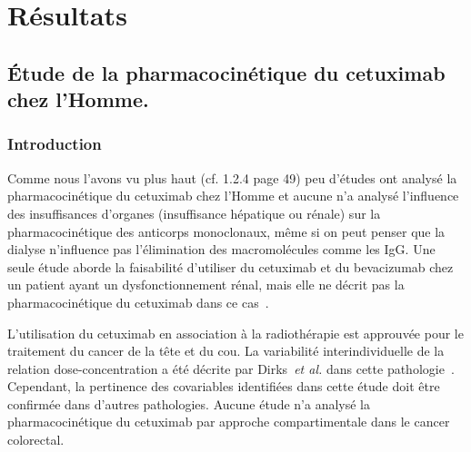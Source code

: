 \chapter{Résultats}

\section{Étude de la pharmacocinétique du cetuximab chez l'Homme.}
\subsection{Introduction}
Comme nous l'avons vu plus haut (cf. 1.2.4 page 49) peu d'études ont analysé la pharmacocinétique du cetuximab chez l'Homme et aucune n'a analysé l'influence des insuffisances d'organes (insuffisance hépatique ou rénale) sur la pharmacocinétique des anticorps monoclonaux, même si on peut penser que la dialyse n'influence pas l'élimination des macromolécules comme les IgG. Une seule étude aborde la faisabilité d'utiliser du cetuximab et du bevacizumab chez un patient ayant un dysfonctionnement rénal, mais elle ne décrit pas la pharmacocinétique du cetuximab dans ce cas~\citep{REF135}.

L'utilisation du cetuximab en association à la radiothérapie est approuvée pour le traitement du cancer de la tête et du cou. La variabilité interindividuelle de la relation dose-concentration a été décrite par Dirks~\textit{et al.} dans cette pathologie~\citep{REF68}. Cependant, la pertinence des covariables identifiées dans cette étude doit être confirmée dans d'autres pathologies. Aucune étude n'a analysé la pharmacocinétique du cetuximab par approche compartimentale dans le cancer colorectal.
